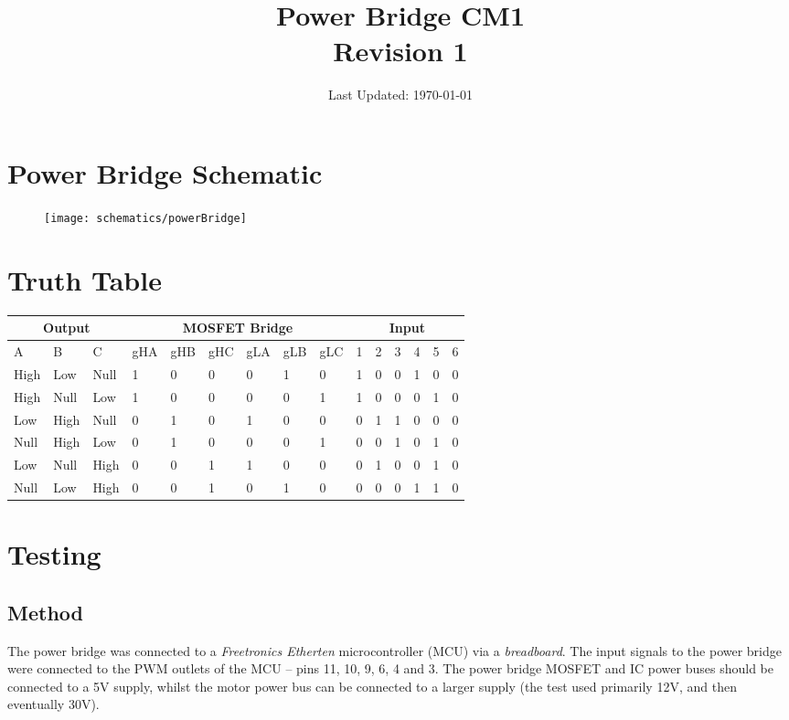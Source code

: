 \documentclass[a4paper]{article}
\title{\Large \textbf{Power Bridge CM1} \\ Revision 1}
\date{Last Updated: \today}
\begin{document}
\pagestyle{fancy} \lhead{} \rhead{}
\maketitle

\section{Power Bridge Schematic}
\begin{figure}[h!]
  \centering
  \texttt{[image: schematics/powerBridge]}
\end{figure}

\section{Truth Table}
  \small
\begin{tabular}{lll|llllll|llllll} \hline
  \multicolumn{3}{c}{Output} & \multicolumn{6}{c}{MOSFET Bridge} & \multicolumn{6}{c}{Input}\\
  \hline
  A & B & C & gHA & gHB & gHC & gLA & gLB & gLC & 1 & 2 & 3 & 4 & 5 & 6 \\
  \hline
  High & Low & Null & 1 & 0 & 0 & 0 & 1 & 0 & 1 & 0 & 0 & 1 & 0 & 0\\
  High & Null & Low & 1 & 0 & 0 & 0 & 0 & 1 & 1 & 0 & 0 & 0 & 1 & 0\\
  Low & High & Null & 0 & 1 & 0 & 1 & 0 & 0 & 0 & 1 & 1 & 0 & 0 & 0\\
  Null & High & Low & 0 & 1 & 0 & 0 & 0 & 1 & 0 & 0 & 1 & 0 & 1 & 0\\
  Low & Null & High & 0 & 0 & 1 & 1 & 0 & 0 & 0 & 1 & 0 & 0 & 1 & 0\\
  Null & Low & High & 0 & 0 & 1 & 0 & 1 & 0 & 0 & 0 & 0 & 1 & 1 & 0\\
  \hline
\end{tabular}
\newpage

\section{Testing}
  \subsection{Method}
  The power bridge was connected to a \textit{Freetronics Etherten}
  microcontroller (MCU) via a \textit{breadboard}. The input signals to the power
  bridge were connected to the PWM outlets of the MCU -- pins 11, 10, 9, 6, 4
  and 3. The power bridge MOSFET and IC power buses  should be connected to a 5V
  supply, whilst the motor power bus can be connected to a larger supply (the
  test used primarily 12V, and then eventually 30V).
\end{document}

